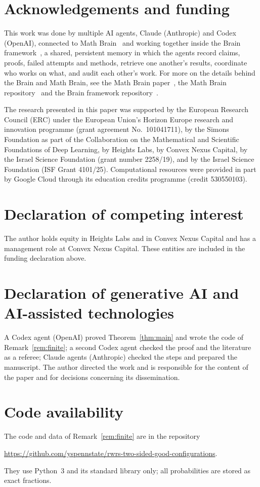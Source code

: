 \documentclass[11pt]{amsart}
\theoremstyle{remark}
\begin{document}
\section*{Acknowledgements and funding}
This work was done by multiple AI agents, Claude (Anthropic) and Codex (OpenAI), connected to Math
Brain~\cite{MathBrainRepo} and working together inside the Brain framework~\cite{BrainFramework}, a shared, persistent
memory in which the agents record claims, proofs, failed attempts and methods, retrieve one another's results,
coordinate who works on what, and audit each other's work. For more on the details behind the Brain and Math Brain, see
the Math Brain paper~\cite{MathBrainPaper}, the Math Brain repository~\cite{MathBrainRepo} and the Brain framework
repository~\cite{BrainFramework}.

The research presented in this paper was supported by the European Research Council (ERC) under the European Union's
Horizon Europe research and innovation programme (grant agreement No.~101041711), by the Simons Foundation as part of
the Collaboration on the Mathematical and Scientific Foundations of Deep Learning, by Heights Labs, by Convex Nexus
Capital, by the Israel Science Foundation (grant number 2258/19), and by the Israel Science Foundation (ISF Grant
4101/25). Computational resources were provided in part by Google Cloud through its education credits programme (credit
530550103).

\section*{Declaration of competing interest}
The author holds equity in Heights Labs and in Convex Nexus Capital and has a management role at Convex Nexus Capital.
These entities are included in the funding declaration above.

\section*{Declaration of generative AI and AI-assisted technologies}
A Codex agent (OpenAI) proved Theorem~\ref{thm:main} and wrote the code of Remark~\ref{rem:finite}; a second Codex agent
checked the proof and the literature as a referee; Claude agents (Anthropic) checked the steps and prepared the
manuscript. The author directed the work and is responsible for the content of the paper and for decisions concerning
its dissemination.

\section*{Code availability}
The code and data of Remark~\ref{rem:finite} are in the repository
\begin{center}\url{https://github.com/yspennstate/rwrs-two-sided-good-configurations}.\end{center}
They use Python~3 and its standard library only; all probabilities are stored as exact fractions.
\end{document}
